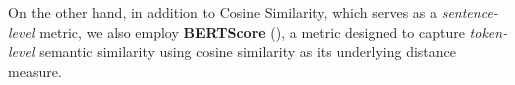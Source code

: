 %
%
%
%
%
%
%
On the other hand, in addition to Cosine Similarity, which serves as a \textit{sentence-level} metric, we also employ \textbf{BERTScore} (\cite{zhang2019bertscore}), a metric designed to capture \textit{token-level} semantic similarity using cosine similarity as its underlying distance measure.

